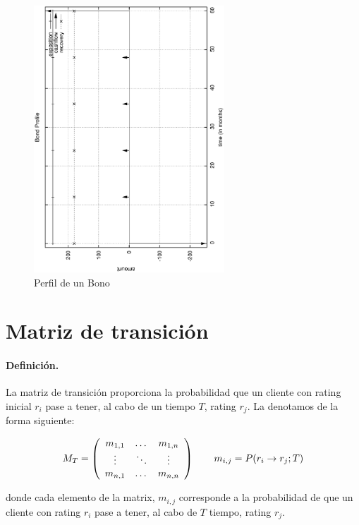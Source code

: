\begin{figure}[!hb]
\begin{center}
\includegraphics[height=10cm, angle=-90]{./images/bond.ps}
\caption{Perfil de un Bono}
\label{bond}
\end{center}
\end{figure}


\section{Matriz de transici\'on}
\label{sec:mtransition}

\paragraph{Definici\'on.} La matriz de transici\'on proporciona la probabilidad 
que un cliente con rating inicial $r_i$ pase a tener, al cabo de un tiempo $T$, 
rating $r_j$. La denotamos de la forma siguiente:

\begin{displaymath}
M_T = \left(
\begin{array}{ccc}
m_{1,1} & \dots  & m_{1,n} \cr
\vdots & \ddots & \vdots \cr
m_{n,1} & \dots  & m_{n,n} 
\end{array}
\right)
\qquad
m_{i,j} = P(r_i \to r_j;T)
\end{displaymath}

donde cada elemento de la matrix, $m_{i,j}$ corresponde a la 
probabilidad de que un cliente con rating $r_i$ pase a tener, al cabo de $T$ 
tiempo, rating $r_j$.

